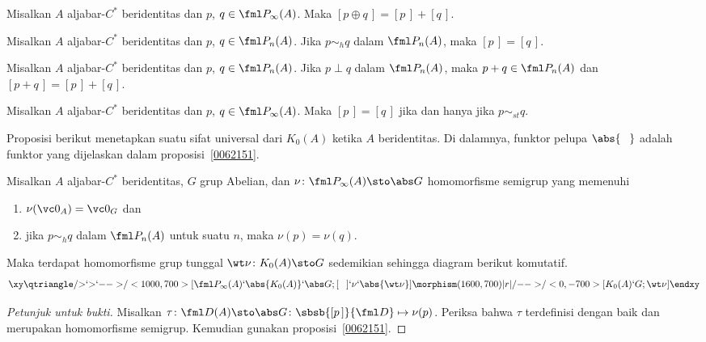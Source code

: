 \begin{prop} Misalkan $A$ aljabar-$C^*$ beridentitas dan $p$, $q \in \fml P_\infty(A)$. Maka $[p
\oplus q\,] = [p\,] + [q\,]$.
\end{prop}

\begin{prop} Misalkan $A$ aljabar-$C^*$ beridentitas dan $p$, $q \in \fml P_n(A)$. Jika $p \sim_h q$
dalam $\fml P_n(A)$, maka $[p\,] = [q\,]$.
\end{prop}

\begin{prop} Misalkan $A$ aljabar-$C^*$ beridentitas dan $p$, $q \in \fml P_n(A)$. Jika $p \perp q$
dalam $\fml P_n(A)$, maka $p + q \in \fml P_n(A)$ dan $[p + q\,] = [p\,] + [q\,]$.
\end{prop}

\begin{prop} Misalkan $A$ aljabar-$C^*$ beridentitas dan $p$, $q \in \fml P_\infty(A)$. Maka
$[p\,] = [q\,]$ jika dan hanya jika $p \sim_{st} q$.
\end{prop}

 Proposisi berikut menetapkan suatu sifat universal dari $K_0(A)$ ketika $A$ beridentitas. Di dalamnya, funktor pelupa $\abs{\hphantom{G}}$
 adalah funktor yang dijelaskan dalam proposisi~\ref{0062151}.

\begin{prop}\label{0062244} Misalkan $A$ aljabar-$C^*$ beridentitas, $G$ grup Abelian, dan $\nu\colon \fml P_\infty(A) \sto \abs G$
homomorfisme semigrup yang memenuhi
 \begin{enumerate}[label=\rm{(\alph*)}]
    \item $\nu(\vc 0_A) = \vc 0_G$ dan
    \item jika $p \sim_h q$ dalam $\fml P_n(A)$ untuk suatu $n$, maka $\nu(p) = \nu(q)$.
 \end{enumerate}
Maka terdapat homomorfisme grup tunggal $\wt\nu\colon K_0(A) \sto G$ sedemikian sehingga diagram berikut komutatif.
   \[\xy
      \qtriangle/{>}`{>}`{-->}/<1000,700>[\fml P_\infty(A)`\abs{K_0(A)}`\abs G;{[\hphantom{P}]}`\nu`\abs{\wt\nu}]
      \morphism(1600,700)|r|/{-->}/<0,-700>[K_0(A)`G;\wt\nu]
     \endxy\]
\end{prop}

\begin{proof}[\emph{Petunjuk untuk bukti}] Misalkan $\tau\colon \fml D(A) \sto \abs G\colon \sbsb{[p\,]}{\fml D} \mapsto \nu(p)$. %
Periksa bahwa $\tau$ terdefinisi dengan baik dan merupakan homomorfisme semigrup. Kemudian gunakan proposisi~\ref{0062151}.  \ns
\end{proof}

